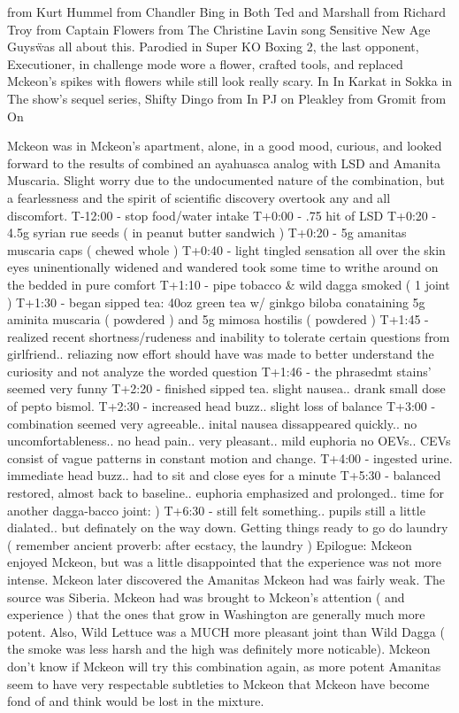 \documentclass[12pt]{book}
\begin{document}
from Kurt Hummel from Chandler Bing in Both Ted and Marshall from Richard Troy from Captain Flowers from The Christine Lavin song \"Sensitive New Age Guys\" was all about this. Parodied in Super KO Boxing 2, the last opponent, Executioner, in challenge mode wore a flower, crafted tools, and replaced Mckeon's spikes with flowers while still look really scary. In In Karkat in Sokka in The show's sequel series, Shifty Dingo from In PJ on Pleakley from Gromit from On



Mckeon was in Mckeon's apartment, alone, in a good mood, curious, and looked forward to the results of combined an ayahuasca analog with LSD and Amanita Muscaria. Slight worry due to the undocumented nature of the combination, but a fearlessness and the spirit of scientific discovery overtook any and all discomfort. T-12:00 - stop food/water intake T+0:00 - .75 hit of LSD T+0:20 - 4.5g syrian rue seeds ( in peanut butter sandwich ) T+0:20 - 5g amanitas muscaria caps ( chewed whole ) T+0:40 - light tingled sensation all over the skin eyes uninentionally widened and wandered took some time to writhe around on the bedded in pure comfort T+1:10 - pipe tobacco \& wild dagga smoked ( 1 joint ) T+1:30 - began sipped tea: 40oz green tea w/ ginkgo biloba conataining 5g aminita muscaria ( powdered ) and 5g mimosa hostilis ( powdered ) T+1:45 - realized recent shortness/rudeness and inability to tolerate certain questions from girlfriend.. reliazing now effort should have was made to better understand the curiosity and not analyze the worded question T+1:46 - the phrasedmt stains' seemed very funny T+2:20 - finished sipped tea. slight nausea.. drank small dose of pepto bismol. T+2:30 - increased head buzz.. slight loss of balance T+3:00 - combination seemed very agreeable.. inital nausea dissappeared quickly.. no uncomfortableness.. no head pain.. very pleasant.. mild euphoria no OEVs.. CEVs consist of vague patterns in constant motion and change. T+4:00 - ingested urine. immediate head buzz.. had to sit and close eyes for a minute T+5:30 - balanced restored, almost back to baseline.. euphoria emphasized and prolonged.. time for another dagga-bacco joint: ) T+6:30 - still felt something.. pupils still a little dialated.. but definately on the way down. Getting things ready to go do laundry ( remember ancient proverb: after ecstacy, the laundry ) Epilogue: Mckeon enjoyed Mckeon, but was a little disappointed that the experience was not more intense. Mckeon later discovered the Amanitas Mckeon had was fairly weak. The source was Siberia. Mckeon had was brought to Mckeon's attention ( and experience ) that the ones that grow in Washington are generally much more potent. Also, Wild Lettuce was a MUCH more pleasant joint than Wild Dagga ( the smoke was less harsh and the high was definitely more noticable). Mckeon don't know if Mckeon will try this combination again, as more potent Amanitas seem to have very respectable subtleties to Mckeon that Mckeon have become fond of and think would be lost in the mixture.
\end{document}

